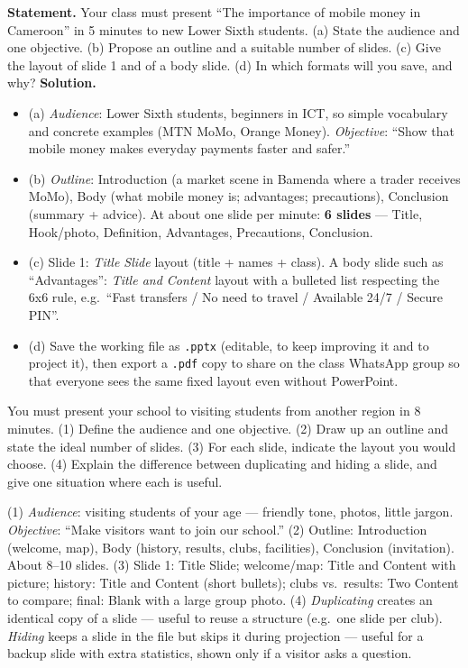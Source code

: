 \documentclass[11pt]{article}
\begin{document}
\begin{exoresolu}
\textbf{Statement.} Your class must present ``The importance of mobile money in Cameroon'' in 5 minutes to new Lower Sixth students. (a) State the audience and one objective. (b) Propose an outline and a suitable number of slides. (c) Give the layout of slide 1 and of a body slide. (d) In which formats will you save, and why?
\tcblower
\textbf{Solution.}
\begin{itemize}
\item (a) \emph{Audience}: Lower Sixth students, beginners in ICT, so simple vocabulary and concrete examples (MTN MoMo, Orange Money). \emph{Objective}: ``Show that mobile money makes everyday payments faster and safer.''
\item (b) \emph{Outline}: Introduction (a market scene in Bamenda where a trader receives MoMo), Body (what mobile money is; advantages; precautions), Conclusion (summary + advice). At about one slide per minute: \textbf{6 slides} --- Title, Hook/photo, Definition, Advantages, Precautions, Conclusion.
\item (c) Slide 1: \emph{Title Slide} layout (title + names + class). A body slide such as ``Advantages'': \emph{Title and Content} layout with a bulleted list respecting the 6x6 rule, e.g.\ ``Fast transfers / No need to travel / Available 24/7 / Secure PIN''.
\item (d) Save the working file as \texttt{.pptx} (editable, to keep improving it and to project it), then export a \texttt{.pdf} copy to share on the class WhatsApp group so that everyone sees the same fixed layout even without PowerPoint.
\end{itemize}
\end{exoresolu}

\begin{exercice}
You must present your school to visiting students from another region in 8 minutes. (1) Define the audience and one objective. (2) Draw up an outline and state the ideal number of slides. (3) For each slide, indicate the layout you would choose. (4) Explain the difference between duplicating and hiding a slide, and give one situation where each is useful.
\end{exercice}

\begin{corrige}[Exercise]
(1) \emph{Audience}: visiting students of your age --- friendly tone, photos, little jargon. \emph{Objective}: ``Make visitors want to join our school.'' (2) Outline: Introduction (welcome, map), Body (history, results, clubs, facilities), Conclusion (invitation). About 8--10 slides. (3) Slide 1: Title Slide; welcome/map: Title and Content with picture; history: Title and Content (short bullets); clubs vs.\ results: Two Content to compare; final: Blank with a large group photo. (4) \emph{Duplicating} creates an identical copy of a slide --- useful to reuse a structure (e.g.\ one slide per club). \emph{Hiding} keeps a slide in the file but skips it during projection --- useful for a backup slide with extra statistics, shown only if a visitor asks a question.
\end{corrige}
\end{document}
